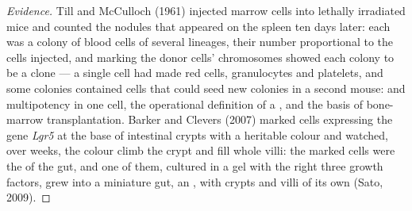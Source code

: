 \begin{proof}[Evidence]
Till and McCulloch (1961) injected marrow cells into lethally
irradiated mice and counted the nodules that appeared on the spleen
ten days later: each was a colony of blood cells of several lineages,
their number proportional to the cells injected, and marking the
donor cells' chromosomes showed each colony to be a clone --- a single
cell had made red cells, granulocytes and platelets, and some colonies
contained cells that could seed new colonies in a second mouse:
 and multipotency in one cell, the operational definition of
a , and the basis of bone-marrow transplantation. Barker and
Clevers (2007) marked cells expressing the gene \emph{Lgr5} at the base
of intestinal crypts with a heritable colour and watched, over weeks,
the colour climb the crypt and fill whole villi: the marked cells were
the  of the gut, and one of them, cultured in a gel with the
right three growth factors, grew into a miniature gut, an
\emph{}, with crypts and villi of its own (Sato, 2009).
\end{proof}


